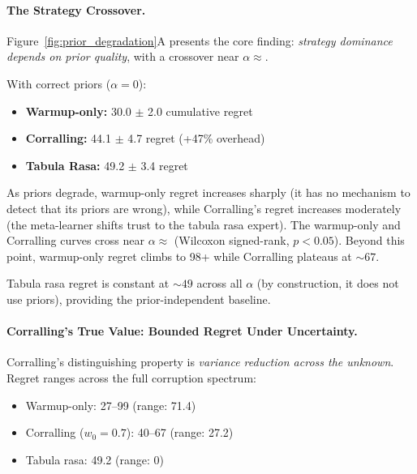 \paragraph{The Strategy Crossover.}
Figure~\ref{fig:prior_degradation}A presents the core finding:
\emph{strategy dominance depends on prior quality}, with a crossover
near $\alpha{\approx}$\CrossoverWC{}.

With correct priors ($\alpha{=}0$):
\begin{itemize}[nosep]
    \item \textbf{Warmup-only:} 30.0 $\pm$ 2.0 cumulative regret
    \item \textbf{Corralling:} 44.1 $\pm$ 4.7 regret (+47\% overhead)
    \item \textbf{Tabula Rasa:} 49.2 $\pm$ 3.4 regret
\end{itemize}

As priors degrade, warmup-only regret increases sharply (it has no
mechanism to detect that its priors are wrong), while Corralling's
regret increases moderately (the meta-learner shifts trust to the
tabula rasa expert).  The warmup-only and Corralling curves cross near
$\alpha{\approx}$\CrossoverWC{} (Wilcoxon signed-rank, $p{<}0.05$).
Beyond this point, warmup-only regret climbs to 98+ while Corralling
plateaus at ${\sim}67$.

Tabula rasa regret is constant at ${\sim}49$ across all $\alpha$
(by construction, it does not use priors), providing the
prior-independent baseline.

\paragraph{Corralling's True Value: Bounded Regret Under Uncertainty.}
Corralling's distinguishing property is
\emph{variance reduction across the unknown}.
Regret ranges across the full corruption spectrum:

\begin{itemize}[nosep]
    \item Warmup-only: 27--99 (range: 71.4)
    \item Corralling ($w_0{=}0.7$): 40--67 (range: 27.2)
    \item Tabula rasa: 49.2 (range: 0)
\end{itemize}

